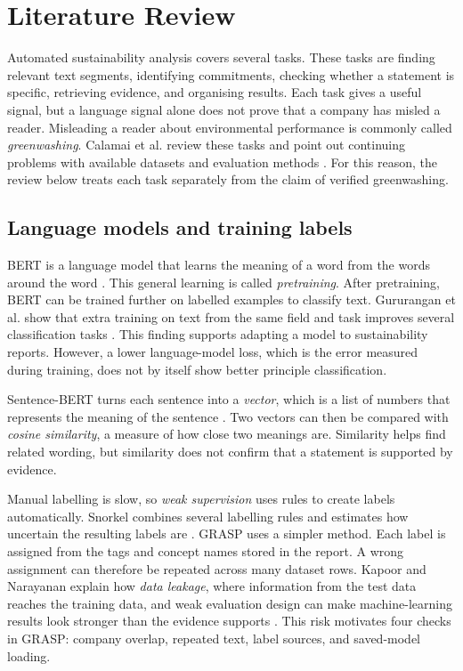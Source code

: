 \section{Literature Review}
\label{sec:literature}

Automated sustainability analysis covers several tasks. These tasks are finding relevant text segments, identifying commitments, checking whether a statement is specific, retrieving evidence, and organising results. Each task gives a useful signal, but a language signal alone does not prove that a company has misled a reader. Misleading a reader about environmental performance is commonly called \emph{greenwashing}. Calamai et al. review these tasks and point out continuing problems with available datasets and evaluation methods \cite{calamai2025}. For this reason, the review below treats each task separately from the claim of verified greenwashing.

\subsection{Language models and training labels}

BERT is a language model that learns the meaning of a word from the words around the word \cite{devlin2019}. This general learning is called \emph{pretraining}. After pretraining, BERT can be trained further on labelled examples to classify text. Gururangan et al. show that extra training on text from the same field and task improves several classification tasks \cite{gururangan2020}. This finding supports adapting a model to sustainability reports. However, a lower language-model loss, which is the error measured during training, does not by itself show better principle classification.

Sentence-BERT turns each sentence into a \emph{vector}, which is a list of numbers that represents the meaning of the sentence \cite{reimers2019}. Two vectors can then be compared with \emph{cosine similarity}, a measure of how close two meanings are. Similarity helps find related wording, but similarity does not confirm that a statement is supported by evidence.

Manual labelling is slow, so \emph{weak supervision} uses rules to create labels automatically. Snorkel combines several labelling rules and estimates how uncertain the resulting labels are \cite{ratner2017}. GRASP uses a simpler method. Each label is assigned from the tags and concept names stored in the report. A wrong assignment can therefore be repeated across many dataset rows. Kapoor and Narayanan explain how \emph{data leakage}, where information from the test data reaches the training data, and weak evaluation design can make machine-learning results look stronger than the evidence supports \cite{kapoor2023}. This risk motivates four checks in GRASP: company overlap, repeated text, label sources, and saved-model loading.

